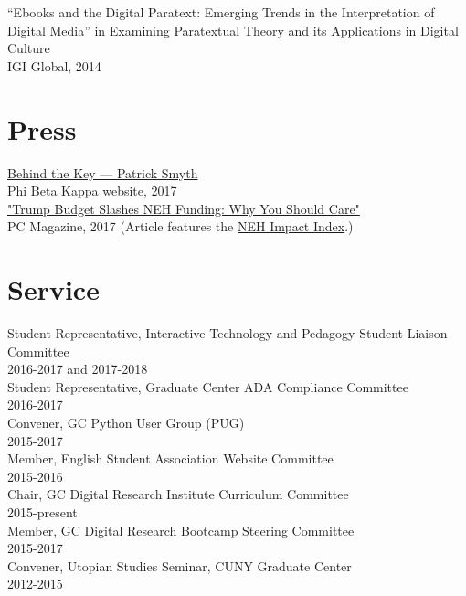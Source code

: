 \documentclass[11pt]{article}
\begin{document}
“Ebooks and the Digital Paratext: Emerging Trends in the Interpretation of Digital Media” in Examining Paratextual Theory and its Applications in Digital Culture\\
IGI Global, 2014\\

\section*{Press}
\label{sec:orgheadline4}
\href{https://www.pbk.org/Behind-the-Key/Patrick-Smyth}{Behind the Key — Patrick Smyth}\\
Phi Beta Kappa website, 2017\\

\href{http://www.pcmag.com/commentary/353904/trump-budget-slashes-neh-funding-why-you-should-care}{"Trump Budget Slashes NEH Funding: Why You Should Care"}\\
PC Magazine, 2017 (Article features the \href{http://www.nehimpact.org/}{NEH Impact Index}.)\\

\section*{Service}
\label{sec:orgheadline5}
Student Representative, Interactive Technology and Pedagogy Student Liaison Committee\\
2016-2017 and 2017-2018\\

Student Representative, Graduate Center ADA Compliance Committee\\
2016-2017\\

Convener, GC Python User Group (PUG)\\
2015-2017\\

Member, English Student Association Website Committee\\
2015-2016\\

Chair, GC Digital Research Institute Curriculum Committee\\
2015-present\\

Member, GC Digital Research Bootcamp Steering Committee\\
2015-2017\\

Convener, Utopian Studies Seminar, CUNY Graduate Center\\
2012-2015\\
\end{document}
